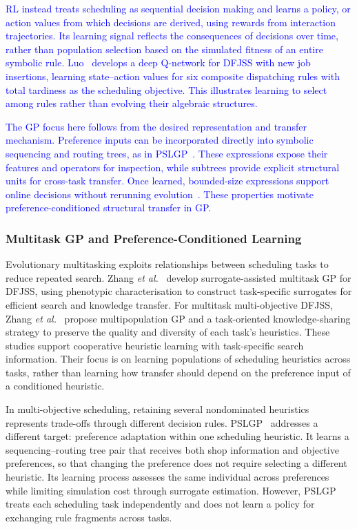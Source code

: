 \documentclass[10pt,journal]{IEEEtran}
\newcommand{\revision}[1]{\textcolor{blue}{#1}}
\begin{document}
\revision{RL instead treats scheduling as sequential decision making and learns a policy, or action values from which decisions are derived, using rewards from interaction trajectories. Its learning signal reflects the consequences of decisions over time, rather than population selection based on the simulated fitness of an entire symbolic rule. Luo~\cite{luo2020dynamic} develops a deep Q-network for DFJSS with new job insertions, learning state--action values for six composite dispatching rules with total tardiness as the scheduling objective. This illustrates learning to select among rules rather than evolving their algebraic structures.}

\revision{The GP focus here follows from the desired representation and transfer mechanism. Preference inputs can be incorporated directly into symbolic sequencing and routing trees, as in PSLGP~\cite{xu2026pslgp}. These expressions expose their features and operators for inspection, while subtrees provide explicit structural units for cross-task transfer. Once learned, bounded-size expressions support online decisions without rerunning evolution~\cite{zhang2024survey}. These properties motivate preference-conditioned structural transfer in GP.}

\subsubsection{Multitask GP and Preference-Conditioned Learning}
Evolutionary multitasking exploits relationships between scheduling tasks to reduce repeated search. Zhang \emph{et al.}~\cite{zhang2021surrogate} develop surrogate-assisted multitask GP for DFJSS, using phenotypic characterisation to construct task-specific surrogates for efficient search and knowledge transfer. For multitask multi-objective DFJSS, Zhang \emph{et al.}~\cite{zhang2023multitask} propose multipopulation GP and a task-oriented knowledge-sharing strategy to preserve the quality and diversity of each task's heuristics. These studies support cooperative heuristic learning with task-specific search information. Their focus is on learning populations of scheduling heuristics across tasks, rather than learning how transfer should depend on the preference input of a conditioned heuristic.

In multi-objective scheduling, retaining several nondominated heuristics represents trade-offs through different decision rules. PSLGP~\cite{xu2026pslgp} addresses a different target: preference adaptation within one scheduling heuristic. It learns a sequencing--routing tree pair that receives both shop information and objective preferences, so that changing the preference does not require selecting a different heuristic. Its learning process assesses the same individual across preferences while limiting simulation cost through surrogate estimation. However, PSLGP treats each scheduling task independently and does not learn a policy for exchanging rule fragments across tasks.
\end{document}
